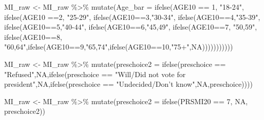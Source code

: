 \documentclass[
]{article}
\newenvironment{Shaded}{\begin{snugshade}}{\end{snugshade}}
\newcommand{\AttributeTok}[1]{\textcolor[rgb]{0.77,0.63,0.00}{#1}}
\newcommand{\ConstantTok}[1]{\textcolor[rgb]{0.00,0.00,0.00}{#1}}
\newcommand{\DecValTok}[1]{\textcolor[rgb]{0.00,0.00,0.81}{#1}}
\newcommand{\FunctionTok}[1]{\textcolor[rgb]{0.00,0.00,0.00}{#1}}
\newcommand{\NormalTok}[1]{#1}
\newcommand{\OtherTok}[1]{\textcolor[rgb]{0.56,0.35,0.01}{#1}}
\newcommand{\SpecialCharTok}[1]{\textcolor[rgb]{0.00,0.00,0.00}{#1}}
\newcommand{\StringTok}[1]{\textcolor[rgb]{0.31,0.60,0.02}{#1}}
\begin{document}
\begin{Shaded}
\begin{Highlighting}[]
\NormalTok{MI\_raw }\OtherTok{\textless{}{-}}\NormalTok{ MI\_raw }\SpecialCharTok{\%\textgreater{}\%}
  \FunctionTok{mutate}\NormalTok{(}\AttributeTok{Age\_bar =} \FunctionTok{ifelse}\NormalTok{(AGE10 }\SpecialCharTok{==} \DecValTok{1}\NormalTok{, }\StringTok{"18{-}24"}\NormalTok{,}
                          \FunctionTok{ifelse}\NormalTok{(AGE10 }\SpecialCharTok{==}\DecValTok{2}\NormalTok{, }\StringTok{"25{-}29"}\NormalTok{,}
                                 \FunctionTok{ifelse}\NormalTok{(AGE10}\SpecialCharTok{==}\DecValTok{3}\NormalTok{,}\StringTok{"30{-}34"}\NormalTok{,}
                                        \FunctionTok{ifelse}\NormalTok{(AGE10}\SpecialCharTok{==}\DecValTok{4}\NormalTok{,}\StringTok{"35{-}39"}\NormalTok{,}
                                               \FunctionTok{ifelse}\NormalTok{(AGE10}\SpecialCharTok{==}\DecValTok{5}\NormalTok{,}\StringTok{"40{-}44"}\NormalTok{,}
                                                      \FunctionTok{ifelse}\NormalTok{(AGE10}\SpecialCharTok{==}\DecValTok{6}\NormalTok{,}\StringTok{"45,49"}\NormalTok{,}
                                                             \FunctionTok{ifelse}\NormalTok{(AGE10}\SpecialCharTok{==}\DecValTok{7}\NormalTok{, }\StringTok{"50,59"}\NormalTok{,}
                                                                    \FunctionTok{ifelse}\NormalTok{(AGE10}\SpecialCharTok{==}\DecValTok{8}\NormalTok{, }\StringTok{"60,64"}\NormalTok{,}\FunctionTok{ifelse}\NormalTok{(AGE10}\SpecialCharTok{==}\DecValTok{9}\NormalTok{,}\StringTok{"65,74"}\NormalTok{,}\FunctionTok{ifelse}\NormalTok{(AGE10}\SpecialCharTok{==}\DecValTok{10}\NormalTok{,}\StringTok{"75+"}\NormalTok{,}\ConstantTok{NA}\NormalTok{)))))))))))}

\NormalTok{MI\_raw }\OtherTok{\textless{}{-}}\NormalTok{ MI\_raw }\SpecialCharTok{\%\textgreater{}\%}
  \FunctionTok{mutate}\NormalTok{(}\AttributeTok{preschoice2 =} \FunctionTok{ifelse}\NormalTok{(preschoice }\SpecialCharTok{==} \StringTok{"Refused"}\NormalTok{,}\ConstantTok{NA}\NormalTok{,}\FunctionTok{ifelse}\NormalTok{(preschoice }\SpecialCharTok{==} \StringTok{"Will/Did not vote for president"}\NormalTok{,}\ConstantTok{NA}\NormalTok{,}\FunctionTok{ifelse}\NormalTok{(preschoice }\SpecialCharTok{==} \StringTok{"Undecided/Don’t know"}\NormalTok{,}\ConstantTok{NA}\NormalTok{,preschoice))))}

\NormalTok{MI\_raw }\OtherTok{\textless{}{-}}\NormalTok{ MI\_raw }\SpecialCharTok{\%\textgreater{}\%}
  \FunctionTok{mutate}\NormalTok{(}\AttributeTok{preschoice2 =} \FunctionTok{ifelse}\NormalTok{(PRSMI20 }\SpecialCharTok{==} \DecValTok{7}\NormalTok{, }\ConstantTok{NA}\NormalTok{, preschoice2))}


\end{Highlighting}
\end{Shaded}
\end{document}
